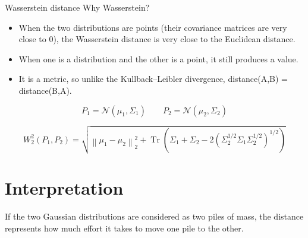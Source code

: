 \begin{frame}[allowframebreaks]{Wasserstein distance}
    Why Wasserstein?
    \begin{itemize}
        \item When the two distributions are points (their covariance matrices are very close to 0), the Wasserstein distance is very close to the Euclidean distance.
        \item When one is a distribution and the other is a point, it still produces a value.
        \item It is a metric, so unlike the Kullback--Leibler divergence, distance(A,B) = distance(B,A).
    \end{itemize}
    \[
        P_1
        =
        \mathcal{N}
        \left(
            \mu_1,
            \Sigma_1
        \right)
        \qquad
        P_2
        =
        \mathcal{N}
        \left(
            \mu_2,
            \Sigma_2
        \right)
    \]
    
    \[
        W_2^2
        \left(
            P_1,
            P_2
        \right)
        =
        \sqrt{
            \left\lVert
                \mu_1 - \mu_2
            \right\rVert_2^2
            +
            \operatorname{Tr}
            \left(
                \Sigma_1
            +
                \Sigma_2
            -
            2
                \left(
                    \Sigma_2^{1/2}
                    \Sigma_1
                    \Sigma_2^{1/2}
                \right)^{1/2}
            \right)}
    \]
    
    
    \section{Interpretation}
        If the two Gaussian distributions are considered as two piles of mass, the distance represents how much effort it takes to move one pile to the other.
\end{frame}